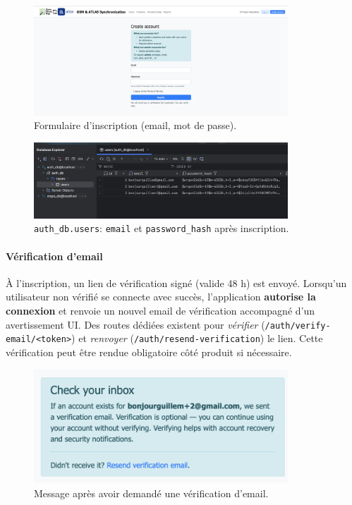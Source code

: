 \begin{figure}[H]
  \centering
  \includegraphics[width=0.85\textwidth]{../figures/chap10/create_account.png}
  \caption[Inscription]{Formulaire d'inscription (email, mot de passe).}
\end{figure}

\begin{figure}[H]
  \centering
  \includegraphics[width=0.85\textwidth]{../figures/chap10/auth_db1.png}
  \caption[users après inscription]{\texttt{auth\_db.users}: \texttt{email} et \texttt{password\_hash} après inscription.}
\end{figure}

\paragraph{Vérification d'email}
À l'inscription, un lien de vérification signé (valide 48 h) est envoyé. Lorsqu'un utilisateur non vérifié se connecte avec succès, l'application \textbf{autorise la connexion} et renvoie un nouvel email de vérification accompagné d'un avertissement UI. Des routes dédiées existent pour \textit{vérifier} (\texttt{/auth/verify-email/<token>}) et \textit{renvoyer} (\texttt{/auth/resend-verification}) le lien. Cette vérification peut être rendue obligatoire côté produit si nécessaire.

\begin{figure}[H]
  \centering
  \includegraphics[width=0.85\textwidth]{../figures/chap10/message after clicking email verification.png}
  \caption[Message vérification email]{Message après avoir demandé une vérification d'email.}
\end{figure}

